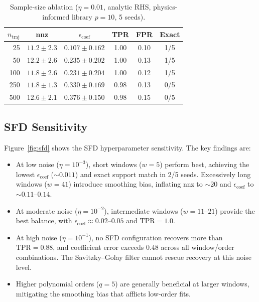 \documentclass[12pt]{article}
\begin{document}
\begin{table}[t]
\centering
\caption{Sample-size ablation ($\eta = 0.01$, analytic RHS, physics-informed library $p=10$, 5 seeds).}
\label{tab:sample_size}
\begin{tabular}{rccccc}
\toprule
$n_\text{traj}$ & nnz & $\epsilon_\text{coef}$ & TPR & FPR & Exact \\
\midrule
25  & $11.2 \pm 2.3$ & $0.107 \pm 0.162$ & 1.00 & 0.10 & 1/5 \\
50  & $12.2 \pm 2.6$ & $0.235 \pm 0.202$ & 1.00 & 0.13 & 1/5 \\
100 & $11.8 \pm 2.6$ & $0.231 \pm 0.204$ & 1.00 & 0.12 & 1/5 \\
250 & $11.8 \pm 1.3$ & $0.330 \pm 0.169$ & 0.98 & 0.13 & 0/5 \\
500 & $12.6 \pm 2.1$ & $0.376 \pm 0.150$ & 0.98 & 0.15 & 0/5 \\
\bottomrule
\end{tabular}
\end{table}


\subsection{SFD Sensitivity}

Figure~\ref{fig:sfd} shows the SFD hyperparameter sensitivity.
The key findings are:

\begin{itemize}
\item At low noise ($\eta = 10^{-3}$), short windows ($w = 5$) perform best, achieving the lowest $\epsilon_\text{coef}$ (${\sim}0.011$) and exact support match in 2/5 seeds. Excessively long windows ($w = 41$) introduce smoothing bias, inflating nnz to ${\sim}20$ and $\epsilon_\text{coef}$ to ${\sim}0.11$--$0.14$.
\item At moderate noise ($\eta = 10^{-2}$), intermediate windows ($w = 11$--$21$) provide the best balance, with $\epsilon_\text{coef} \approx 0.02$--$0.05$ and $\text{TPR} = 1.0$.
\item At high noise ($\eta = 10^{-1}$), no SFD configuration recovers more than $\text{TPR} = 0.88$, and coefficient error exceeds $0.48$ across all window/order combinations. The Savitzky--Golay filter cannot rescue recovery at this noise level.
\item Higher polynomial orders ($q = 5$) are generally beneficial at larger windows, mitigating the smoothing bias that afflicts low-order fits.
\end{itemize}
\end{document}
